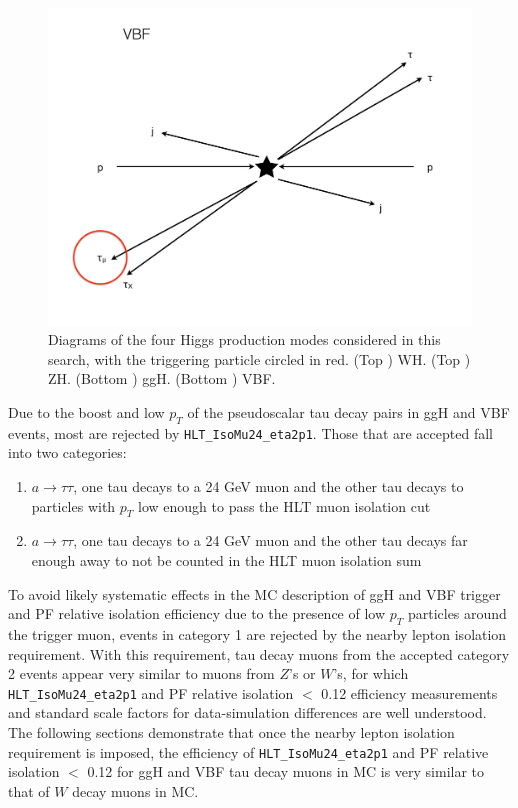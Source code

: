 \begin{figure}[hbtp]
\begin{center}
    \includegraphics[width=\cmsFigWidth]{figures/VBF_trigger}
    \caption{Diagrams of the four Higgs production modes considered in this search, with the triggering particle circled in red.  (Top \cmsLeft) WH.  (Top \cmsRight) ZH.  (Bottom \cmsLeft) ggH.  (Bottom \cmsRight) VBF.}
    \label{fig:WHZH-vs-ggHVBF-trigger}
  \end{center}
\end{figure}

Due to the boost and low $p_T$ of the pseudoscalar tau decay pairs in ggH and VBF events, most are rejected by \texttt{HLT\_IsoMu24\_eta2p1}.  Those that are accepted fall into two categories:

\begin{enumerate}
\item $a\rightarrow\tau\tau$, one tau decays to a 24 GeV muon and the other tau decays to particles with $p_T$ low enough to pass the HLT muon isolation cut
\item $a\rightarrow\tau\tau$, one tau decays to a 24 GeV muon and the other tau decays far enough away to not be counted in the HLT muon isolation sum
\end{enumerate}

To avoid likely systematic effects in the MC description of ggH and VBF trigger and PF relative isolation efficiency due to the presence of low $p_T$ particles around the trigger muon, events in category 1 are rejected by the nearby lepton isolation requirement.  With this requirement, tau decay muons from the accepted category 2 events appear very similar to muons from $Z$'s or $W$'s, for which \texttt{HLT\_IsoMu24\_eta2p1} and PF relative isolation $<$ 0.12 efficiency measurements and standard scale factors for data-simulation differences are well understood.  The following sections demonstrate that once the nearby lepton isolation requirement is imposed, the efficiency of \texttt{HLT\_IsoMu24\_eta2p1} and PF relative isolation $<$ 0.12 for ggH and VBF tau decay muons in MC is very similar to that of $W$ decay muons in MC.

